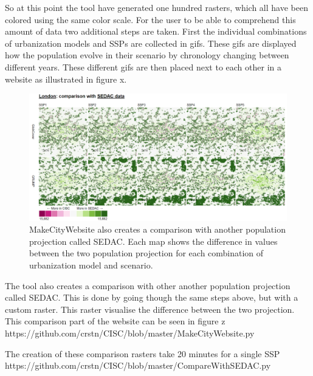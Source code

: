 So at this point the tool have generated one hundred rasters, which all have been colored using the same color scale. For the user to be able to comprehend this amount of data two additional steps are taken. First the individual combinations of urbanization models and SSPs are collected in gifs. These gifs are displayed how the population evolve in their scenario by chronology changing between different years. These different gifs are then placed next to each other in a website as illustrated in figure x. 

\begin{figure} [H]
	\centering
	\includegraphics[width=.8\textwidth]{Pictures/MakeCityWebsite2}
	\caption{MakeCityWebsite also creates a comparison with another population projection called SEDAC. Each map shows the difference in values between the two population projection for each combination of urbanization model and scenario.}
	\label{MakeCityWebsite1}
\end{figure}
The tool also creates a comparison with other another population projection called SEDAC. This is done by going though the same steps above, but with a custom raster. This raster visualise the difference between the two projection. This comparison part of the website can be seen in figure z
https://github.com/crstn/CISC/blob/master/MakeCityWebsite.py

The creation of these comparison rasters take 20 minutes for a single SSP
https://github.com/crstn/CISC/blob/master/CompareWithSEDAC.py




